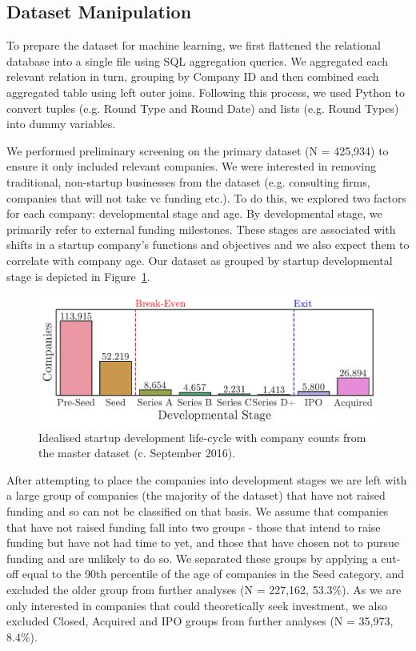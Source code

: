 \documentclass[../thesis/thesis.tex]{subfiles}
\begin{document}
\subsection{Dataset Manipulation}

To prepare the dataset for machine learning, we first flattened the relational database into a single file using SQL aggregation queries. We aggregated each relevant relation in turn, grouping by Company ID and then combined each aggregated table using left outer joins. Following this process, we used Python to convert tuples (e.g. Round Type and Round Date) and lists (e.g. Round Types) into dummy variables.

We performed preliminary screening on the primary dataset (N = 425,934) to ensure it only included relevant companies. We were interested in removing traditional, non-startup businesses from the dataset (e.g. consulting firms, companies that will not take \gls{vc} funding etc.). To do this, we explored two factors for each company: developmental stage and age. By developmental stage, we primarily refer to external funding milestones. These stages are associated with shifts in a startup company's functions and objectives and we also expect them to correlate with company age. Our dataset as grouped by startup developmental stage is depicted in Figure~\ref{fig:design:lifecycle}.

\begin{figure}[!htb]
    \centering
    \includegraphics[width=\textwidth]{../figures/design/descriptives_counts_stage}
    \caption[Startup development life-cycle]{Idealised startup development life-cycle with company counts from the master dataset (c. September 2016).}
    \label{fig:design:lifecycle}
\end{figure}

After attempting to place the companies into development stages we are left with a large group of companies (the majority of the dataset) that have not raised funding and so can not be classified on that basis. We assume that companies that have not raised funding fall into two groups - those that intend to raise funding but have not had time to yet, and those that have chosen not to pursue funding and are unlikely to do so. We separated these groups by applying a cut-off equal to the 90th percentile of the age of companies in the Seed category, and excluded the older group from further analyses (N = 227,162,  53.3\%). As we are only interested in companies that could theoretically seek investment, we also excluded Closed, Acquired and IPO groups from further analyses (N = 35,973, 8.4\%).
\end{document}
